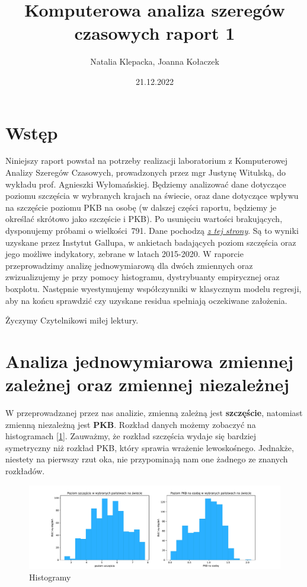 \documentclass{article}
\title{Komputerowa analiza szeregów czasowych raport 1}
\author{Natalia Klepacka, Joanna Kołaczek}
\date{21.12.2022}
\theoremstyle{break}
\begin{document}
	\maketitle
	\tableofcontents
	\clearpage
\section{Wstęp}
	Niniejszy raport powstał na potrzeby realizacji laboratorium z Komputerowej Analizy Szeregów Czasowych, prowadzonych przez mgr Justynę Witulską, do wykładu prof. Agnieszki Wyłomańskiej.
	Będziemy analizować dane dotyczące poziomu szczęścia w wybranych krajach na świecie, oraz dane dotyczące wpływu na szczęście poziomu PKB na osobę (w dalszej części raportu, będziemy je określać skrótowo jako szczęście i PKB). Po usunięciu wartości brakujących, dysponujemy próbami o wielkości~791. Dane pochodzą \href{https://www.kaggle.com/datasets/eliasturk/world-happiness-based-on-cpi-20152020}{\textit{z tej strony}}. Są to wyniki uzyskane przez Instytut Gallupa, w ankietach badających poziom szczęścia oraz jego możliwe indykatory, zebrane  w latach 2015-2020. W raporcie przeprowadzimy analizę jednowymiarową dla dwóch zmiennych oraz zwizualizujemy je przy pomocy histogramu, dystrybuanty empirycznej oraz boxplotu. Następnie wyestymujemy współczynniki w klasycznym modelu regresji, aby na końcu sprawdzić czy uzyskane residua spełniają oczekiwane założenia.
	
	Życzymy Czytelnikowi miłej lektury.
	
\section{Analiza jednowymiarowa zmiennej zależnej oraz zmiennej niezależnej}

W przeprowadzanej przez nas analizie, zmienną zależną jest \textbf{szczęście}, natomiast zmienną niezależną jest \textbf{PKB}. Rozkład danych możemy zobaczyć na histogramach [\ref{fig:hist}]. Zauważmy, że rozkład szczęścia wydaje się bardziej symetryczny niż rozkład PKB, który sprawia wrażenie lewoskośnego. Jednakże, niestety na pierwszy rzut oka, nie przypominają nam one żadnego ze znanych rozkładów.

\begin{figure}[H]
	\begin{center}
		\includegraphics[scale=0.43]{hist.pdf}
		\caption{Histogramy}
		\label{fig:hist}
	\end{center}
\end{figure}
\end{document}
